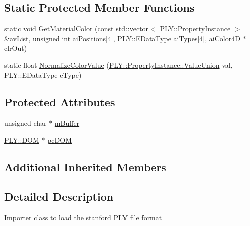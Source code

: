 \subsection*{Static Protected Member Functions}
\begin{DoxyCompactItemize}
\item 
static void \hyperlink{class_assimp_1_1_p_l_y_importer_ab525bf9838cb7948445bbbc8e07a9d11}{Get\+Material\+Color} (const std\+::vector$<$ \hyperlink{class_assimp_1_1_p_l_y_1_1_property_instance}{P\+L\+Y\+::\+Property\+Instance} $>$ \&av\+List, unsigned int ai\+Positions\mbox{[}4\mbox{]}, P\+L\+Y\+::\+E\+Data\+Type ai\+Types\mbox{[}4\mbox{]}, \hyperlink{structai_color4_d}{ai\+Color4\+D} $\ast$clr\+Out)
\item 
static float \hyperlink{class_assimp_1_1_p_l_y_importer_af09f3de2250c2795bf698b7342364833}{Normalize\+Color\+Value} (\hyperlink{union_assimp_1_1_p_l_y_1_1_property_instance_1_1_value_union}{P\+L\+Y\+::\+Property\+Instance\+::\+Value\+Union} val, P\+L\+Y\+::\+E\+Data\+Type e\+Type)
\end{DoxyCompactItemize}
\subsection*{Protected Attributes}
\begin{DoxyCompactItemize}
\item 
unsigned char $\ast$ \hyperlink{class_assimp_1_1_p_l_y_importer_a5e34e5166e05ca6fc28b5c104c577312}{m\+Buffer}
\item 
\hyperlink{class_assimp_1_1_p_l_y_1_1_d_o_m}{P\+L\+Y\+::\+D\+O\+M} $\ast$ \hyperlink{class_assimp_1_1_p_l_y_importer_ad2a1812666d0323abc1c4cf6b24dddef}{pc\+D\+O\+M}
\end{DoxyCompactItemize}
\subsection*{Additional Inherited Members}


\subsection{Detailed Description}
\hyperlink{class_assimp_1_1_importer}{Importer} class to load the stanford P\+L\+Y file format 

